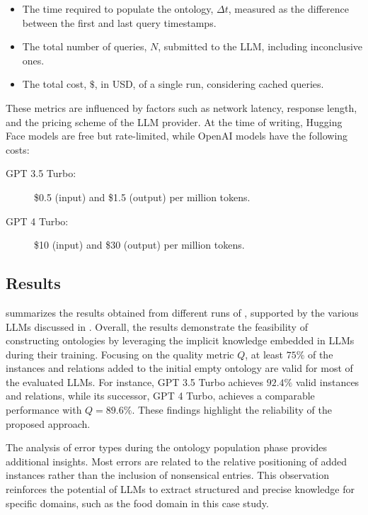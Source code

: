 %
\begin{itemize}
    \item The time required to populate the ontology, \(\Delta t\), measured as the difference between the first and last query timestamps.
    \item The total number of queries, \(N\), submitted to the \gls{LLM}, including inconclusive ones.
    \item The total cost, \(\$\), in USD, of a single \llmfkg{} run, considering cached queries.
\end{itemize}

%
These metrics are influenced by factors such as network latency, response length, and the pricing scheme of the \gls{LLM} provider.
%
At the time of writing, Hugging Face models are free but rate-limited, while OpenAI models have the following costs:
%
\begin{description}
    \item[GPT 3.5 Turbo:] \$0.5 (input) and \$1.5 (output) per million tokens.
    \item[GPT 4 Turbo:] \$10 (input) and \$30 (output) per million tokens.
\end{description}
%


\subsection{Results}
\label{subsec:results}
%

%
 summarizes the results obtained from different runs of \llmfkg{}, supported by the various \glspl{LLM} discussed in .
%
Overall, the results demonstrate the feasibility of constructing ontologies by leveraging the implicit knowledge embedded in \glspl{LLM} during their training.
%
Focusing on the quality metric \(Q\), at least \(75\%\) of the instances and relations added to the initial empty ontology are valid for most of the evaluated \glspl{LLM}.
%
For instance, GPT 3.5 Turbo achieves \(92.4\%\) valid instances and relations, while its successor, GPT 4 Turbo, achieves a comparable performance with \(Q = 89.6\%\).
%
These findings highlight the reliability of the proposed approach.

The analysis of error types during the ontology population phase provides additional insights.
%
Most errors are related to the relative positioning of added instances rather than the inclusion of nonsensical entries.
%
This observation reinforces the potential of \glspl{LLM} to extract structured and precise knowledge for specific domains, such as the food domain in this case study.


